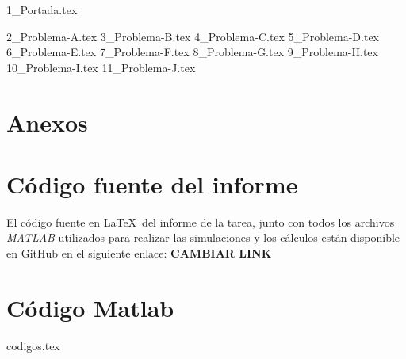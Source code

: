 \documentclass[a4paper,12pt,twoside]{all-in-one} %
\begin{document}

{1_Portada.tex}
{
  \hypersetup{hidelinks}
  \tableofcontents
}
\clearpage


{2_Problema-A.tex}
\FloatBarrier 
\newpage
{3_Problema-B.tex}
\FloatBarrier 
\newpage
{4_Problema-C.tex}
\FloatBarrier 
\newpage
{5_Problema-D.tex}
\FloatBarrier 
\newpage
{6_Problema-E.tex}
\FloatBarrier 
\newpage
{7_Problema-F.tex}
\FloatBarrier 
\newpage
{8_Problema-G.tex}
\FloatBarrier 
\newpage
{9_Problema-H.tex}
\FloatBarrier 
\newpage
{10_Problema-I.tex}
\FloatBarrier 
\newpage
{11_Problema-J.tex}
\FloatBarrier 
\newpage

\clearpage
\appendix
\section*{Anexos} 
\section{Código fuente del informe}
El código fuente en \LaTeX\ del informe de la tarea, junto con todos los archivos
\textit{MATLAB} utilizados para realizar las simulaciones y los cálculos están
disponible en GitHub en el siguiente enlace: \textbf{CAMBIAR LINK}
\section{Código Matlab} 
{codigos.tex}

\clearpage
\pagestyle{\auxsettings}
\printbibliography[heading=bibintoc]
\end{document}
